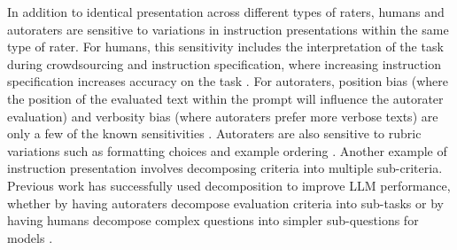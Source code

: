 In addition to identical presentation across different types of raters, humans and autoraters are sensitive to variations in instruction presentations within the same type of rater. For humans, this sensitivity includes the interpretation of the task during crowdsourcing \citep{10.1145/2818048.2820016} and instruction specification, where increasing instruction specification increases accuracy on the task \citep{Wu_Quinn_2017}. For autoraters, position bias (where the position of the evaluated text within the prompt will influence the autorater evaluation) and verbosity bias (where autoraters prefer more verbose texts) are only a few of the known sensitivities \citep{10.5555/3666122.3668142}. Autoraters are also sensitive to rubric variations such as formatting choices \cite{sclar2024quantifying} and example ordering \cite{lu-etal-2022-fantastically}. Another example of instruction presentation involves decomposing criteria into multiple sub-criteria. Previous work has successfully used decomposition to improve LLM performance, whether by having autoraters decompose evaluation criteria into sub-tasks \citep{saha-etal-2024-branch} or by having humans decompose complex questions into simpler sub-questions for models
\citep{patel-etal-2022-question}.

